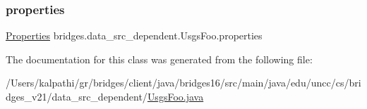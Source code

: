 \hypertarget{classbridges_1_1data__src__dependent_1_1_usgs_foo_a030d83e136f146824b5bda34a4c6fd1c}{}\label{classbridges_1_1data__src__dependent_1_1_usgs_foo_a030d83e136f146824b5bda34a4c6fd1c} 
\subsubsection{\texorpdfstring{properties}{properties}}
{\footnotesize\ttfamily \hyperlink{classbridges_1_1data__src__dependent_1_1_usgs_foo_1_1_properties}{Properties} bridges.\+data\+\_\+src\+\_\+dependent.\+Usgs\+Foo.\+properties}



The documentation for this class was generated from the following file\+:\begin{DoxyCompactItemize}
\item 
/\+Users/kalpathi/gr/bridges/client/java/bridges16/src/main/java/edu/uncc/cs/bridges\+\_\+v21/data\+\_\+src\+\_\+dependent/\hyperlink{_usgs_foo_8java}{Usgs\+Foo.\+java}\end{DoxyCompactItemize}
